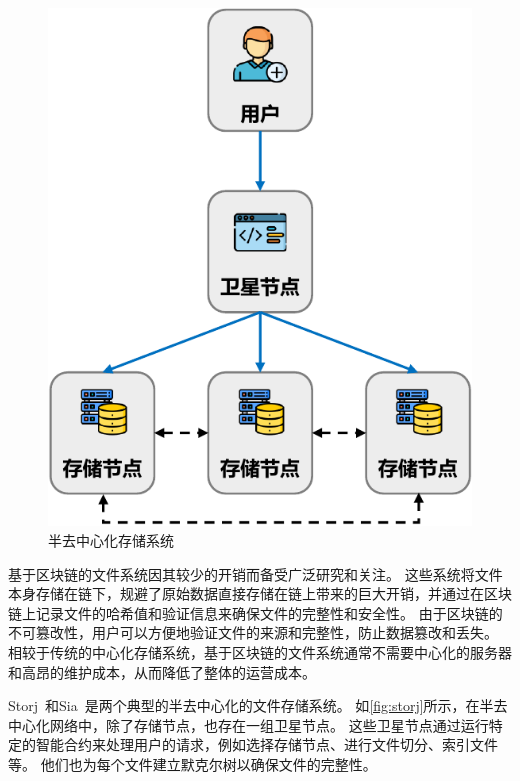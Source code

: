 \begin{figure}[t]
\begin{minipage}{0.45\linewidth}
        \includegraphics[width=1\textwidth]{figures/timechain/storj.pdf}
        \caption{半去中心化存储系统}
        \label{fig:storj}
    \end{minipage}
\end{figure}

基于区块链的文件系统因其较少的开销而备受广泛研究和关注。
这些系统将文件本身存储在链下，规避了原始数据直接存储在链上带来的巨大开销，并通过在区块链上记录文件的哈希值和验证信息来确保文件的完整性和安全性。
由于区块链的不可篡改性，用户可以方便地验证文件的来源和完整性，防止数据篡改和丢失。
相较于传统的中心化存储系统，基于区块链的文件系统通常不需要中心化的服务器和高昂的维护成本，从而降低了整体的运营成本。

Storj~\cite{storj2018storj}和Sia~\cite{vorick2014sia}是两个典型的半去中心化的文件存储系统。
如\autoref{fig:storj}所示，在半去中心化网络中，除了存储节点，也存在一组卫星节点。
这些卫星节点通过运行特定的智能合约来处理用户的请求，例如选择存储节点、进行文件切分、索引文件等。
他们也为每个文件建立默克尔树以确保文件的完整性。

